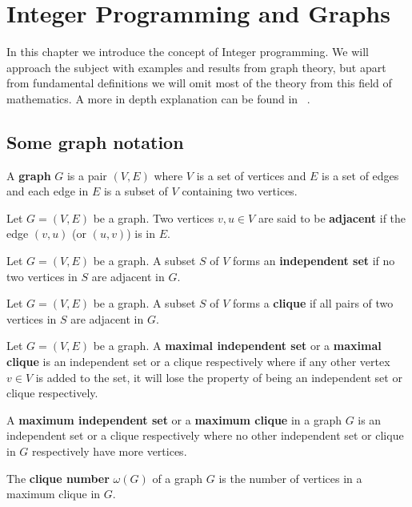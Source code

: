 \chapter{Integer Programming and Graphs}
In this chapter we introduce the concept of Integer programming. We will approach the subject with examples and results from graph theory, but apart from fundamental definitions we will omit most of the theory from this field of mathematics. A more in depth explanation can be found in ~\cite{wolsey1998integer}. 
\section{Some graph notation}
\begin{definition}\label{graph}
A \textbf{graph} $G$ is a pair $(V,E)$ where $V$ is a set of vertices and $E$ is a set of edges and each edge in $E$ is a subset of $V$ containing two vertices.
\end{definition}
\begin{definition}
Let $G=(V,E)$ be a graph. Two vertices $v,u\in V$ are said to be \textbf{adjacent} if the edge $(v,u)$ (or $(u,v)$) is in $E$.
\end{definition}
\begin{definition}
Let $G=(V,E)$ be a graph. A subset $S$ of $V$ forms an \textbf{independent set} if no two vertices in $S$ are adjacent in $G$.
\end{definition}
\begin{definition}
Let $G=(V,E)$ be a graph. A subset $S$ of $V$ forms a \textbf{clique} if all pairs of two vertices in $S$ are adjacent in $G$.
\end{definition}
\begin{definition}
Let $G=(V,E)$ be a graph. A \textbf{maximal independent set} or a \textbf{maximal clique} is an independent set or a clique respectively where if any other vertex $v \in V$ is added to the set, it will lose the property of being an independent set or clique respectively.
\end{definition}
\begin{definition}
A \textbf{maximum independent set} or a \textbf{maximum clique} in a graph $G$ is an independent set or a clique respectively where no other independent set or clique in $G$ respectively have more vertices.
\end{definition}
\begin{definition}
The \textbf{clique number} $\omega(G)$ of a graph $G$ is the number of vertices in a maximum clique in $G$.
\end{definition}

